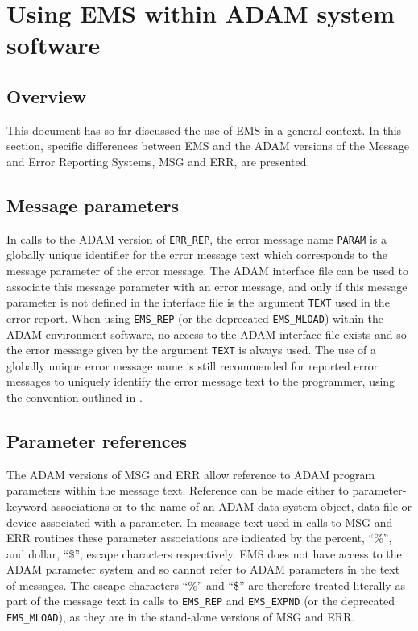 \documentclass[twoside,11pt]{starlink}
\begin{document}
\newpage
\section{Using EMS within ADAM
system software} \label{ADAM_sect}
\subsection{Overview}
This document has so far discussed the use of EMS in a general context.
In this section, specific differences between EMS and the ADAM versions of
the Message and Error Reporting Systems, MSG and ERR, are presented.

\subsection{Message parameters}
In calls to the ADAM version of \texttt{ERR\_REP}, the error message name
\texttt{PARAM} is a
globally unique identifier for the error message text which corresponds to
the message parameter of the error message.
The ADAM interface file can be used to associate this message parameter with
an error message, and only if this message parameter is not defined in the
interface file is the argument \texttt{TEXT} used in the error report.
When using \texttt{EMS\_REP} (or the deprecated \texttt{EMS\_MLOAD}) within the
ADAM environment software, no access to the ADAM interface file exists and so
the error message given by the argument \texttt{TEXT} is always used.
The use of a globally unique error message name is still recommended for
reported error messages to uniquely identify the error message text to the
programmer, using the convention outlined in
.

\subsection{Parameter references}
The ADAM versions of MSG and ERR allow reference to ADAM program
parameters within the message text.
Reference can be made either to parameter-keyword associations or to the name
of an ADAM data system object, data file or device associated with a parameter.
In message text used in calls to MSG and ERR routines these parameter
associations are indicated by the percent, ``\%'', and dollar, ``\$'', escape
characters respectively.
EMS does not have access to the ADAM parameter system and so cannot refer
to ADAM parameters in the text of  messages.
The escape characters ``\%'' and ``\$'' are therefore treated literally as
part of the message text in calls to \texttt{EMS\_REP} and \texttt{EMS\_EXPND}
(or the deprecated \texttt{EMS\_MLOAD}), as they are in the stand-alone
versions of MSG and ERR.
\end{document}

